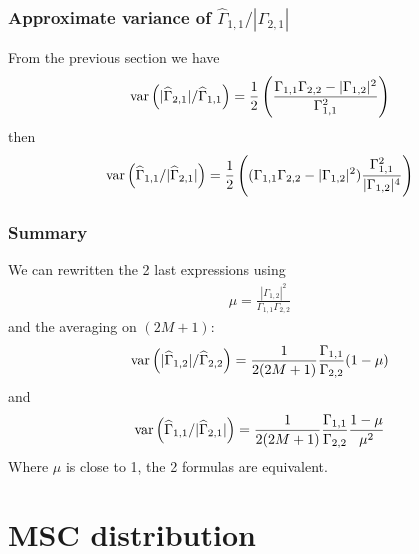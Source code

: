 
\subsubsection{Approximate variance of $\hat\Gamma_{1,1}/|\Gamma_{2,1}|$}
From the previous section we have
\begin{eqnarray*}
 \mathrm{var}\left( |\widehat\Gamma_{2,1}|/\widehat\Gamma_{1,1} \right) =\frac{1}{2}
 \left(
  \frac{\Gamma_{1,1}\Gamma_{2,2}-|\Gamma_{1,2}|^{2}}
  {\Gamma_{1,1}^{2}}
 \right)
\end{eqnarray*} 
then
\begin{eqnarray*}
 \mathrm{var}\left( \widehat\Gamma_{1,1}/|\widehat\Gamma_{2,1}| \right) =\frac{1}{2}
 \left(
  (\Gamma_{1,1}\Gamma_{2,2}-|\Gamma_{1,2}|^{2})
  \frac{\Gamma_{1,1}^{2}}{|\Gamma_{1,2}|^{4}}
 \right)
\end{eqnarray*} 
\subsubsection{Summary}
We can rewritten the 2 last expressions using
\begin{eqnarray*}
 \mu=\frac{|\Gamma_{1,2}|^{2}}{\Gamma_{1,1}\Gamma_{2,2}}
\end{eqnarray*}
and the averaging on $(2M+1)$:
\begin{eqnarray}
\label{eq:var12on22}
 \mathrm{var}\left( |\widehat\Gamma_{1,2}|/\widehat\Gamma_{2,2} \right) =\frac{1}{2(2M+1)}
   \frac{\Gamma_{1,1}}{\Gamma_{2,2}} (1-\mu)
\end{eqnarray} 
and
\begin{eqnarray}
\label{eq:var11on21}
 \mathrm{var}\left( \widehat\Gamma_{1,1}/|\widehat\Gamma_{2,1}| \right) 
  =\frac{1}{2(2M+1)}\frac{\Gamma_{1,1}}{\Gamma_{2,2}}
  \frac{1-\mu}{\mu^{2}}
\end{eqnarray} 
Where $\mu$ is close to 1, the 2 formulas are equivalent.

\section{MSC distribution}


